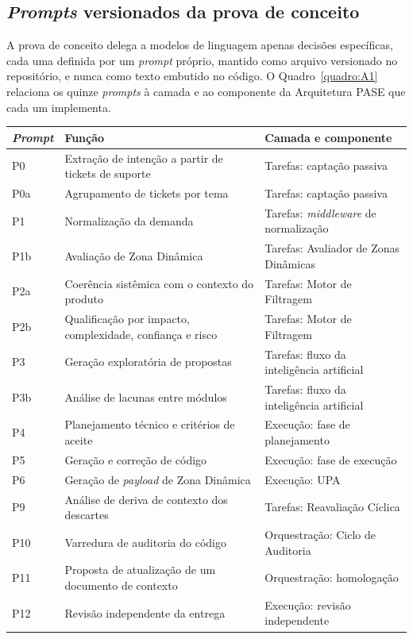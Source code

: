 \begin{apendicesenv}
\partapendices

\chapter[Prompts versionados da prova de conceito]{\textit{Prompts} versionados da prova de conceito}
A prova de conceito delega a modelos de linguagem apenas decisões específicas, cada uma definida por um \textit{prompt} próprio, mantido como arquivo versionado no repositório, e nunca como texto embutido no código. O Quadro~\ref{quadro:A1} relaciona os quinze \textit{prompts} à camada e ao componente da Arquitetura PASE que cada um implementa.

\begin{quadro}[htb]
\centering
\caption{Prompts da prova de conceito e componentes correspondentes}
\label{quadro:A1}
\footnotesize
\renewcommand{\arraystretch}{1.25}
\begin{tabularx}{\textwidth}{|X|X|X|}
\hline
\textbf{\textit{Prompt}} & \textbf{Função} & \textbf{Camada e componente} \\
\hline
P0 & Extração de intenção a partir de tickets de suporte & Tarefas: captação passiva \\
\hline
P0a & Agrupamento de tickets por tema & Tarefas: captação passiva \\
\hline
P1 & Normalização da demanda & Tarefas: \textit{middleware} de normalização \\
\hline
P1b & Avaliação de Zona Dinâmica & Tarefas: Avaliador de Zonas Dinâmicas \\
\hline
P2a & Coerência sistêmica com o contexto do produto & Tarefas: Motor de Filtragem \\
\hline
P2b & Qualificação por impacto, complexidade, confiança e risco & Tarefas: Motor de Filtragem \\
\hline
P3 & Geração exploratória de propostas & Tarefas: fluxo da inteligência artificial \\
\hline
P3b & Análise de lacunas entre módulos & Tarefas: fluxo da inteligência artificial \\
\hline
P4 & Planejamento técnico e critérios de aceite & Execução: fase de planejamento \\
\hline
P5 & Geração e correção de código & Execução: fase de execução \\
\hline
P6 & Geração de \textit{payload} de Zona Dinâmica & Execução: UPA \\
\hline
P9 & Análise de deriva de contexto dos descartes & Tarefas: Reavaliação Cíclica \\
\hline
P10 & Varredura de auditoria do código & Orquestração: Ciclo de Auditoria \\
\hline
P11 & Proposta de atualização de um documento de contexto & Orquestração: homologação \\
\hline
P12 & Revisão independente da entrega & Execução: revisão independente \\
\hline
\end{tabularx}
\end{quadro}


\end{apendicesenv}
